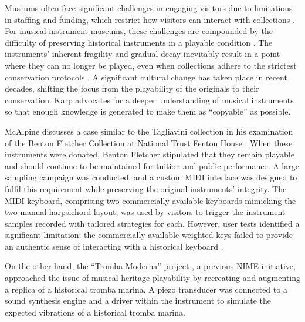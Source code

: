 Museums often face significant challenges in engaging visitors due to limitations in staffing and funding, which restrict how visitors can interact with collections \cite{Templeton2018, McAlpine2014}. For musical instrument museums, these challenges are compounded by the difficulty of preserving historical instruments in a playable condition \cite{McAlpine2014}. The instruments' inherent fragility and gradual decay inevitably result in a point where they can no longer be played, even when collections adhere to the strictest conservation protocols \cite{NYT_strad}. A significant cultural change has taken place in recent decades, shifting the focus from the playability of the originals to their conservation. Karp \cite{Karp1979,Karp1985} advocates for a deeper understanding of musical instruments so that enough knowledge is generated to make them as ``copyable'' as possible.

McAlpine discusses a case similar to the Tagliavini collection in his examination of the Benton Fletcher Collection at National Trust Fenton House \cite{McAlpine2014}. When these instruments were donated, Benton Fletcher stipulated that they remain playable and should continue to be maintained for tuition and public performance. A large sampling campaign was conducted, and a custom MIDI interface was designed to fulfil this requirement while preserving the original instruments' integrity. The MIDI keyboard, comprising two commercially available keyboards mimicking the two-manual harpsichord layout, was used by visitors to trigger the instrument samples recorded with tailored strategies for each. However, user tests identified a significant limitation: the commercially available weighted keys failed to provide an authentic sense of interacting with a historical keyboard \cite{McAlpine2014}. 

On the other hand, the ``Tromba Moderna'' project \cite{Baldwin2016}, a previous NIME initiative, approached the issue of musical heritage playability by recreating and augmenting a replica of a historical tromba marina. A piezo transducer was connected to a sound synthesis engine and a driver within the instrument to simulate the expected vibrations of a historical tromba marina. 


